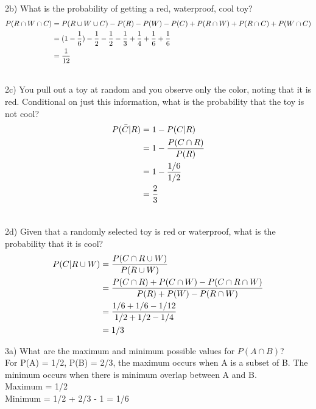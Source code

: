 \documentclass[fleqn]{article}
\begin{document}
2b) What is the probability of getting a red, waterproof, cool toy?\\
\begin{equation} \begin{aligned}
P(R \cap W \cap C) &= P(R \cup W \cup C) - P(R) - P(W) - P(C) + P(R \cap W) + P(R \cap C) + P(W \cap C)\\
		&= (1-{1\over6}) - {1\over2} -{1\over2} -{1\over3} + {1\over4} +{1\over6} + {1\over6} \\
		&={1\over12}\\ \\
\end{aligned} \end{equation}

2c) You pull out a toy at random and you observe only the color, noting that it is red. Conditional on just this information, what is the probability that the toy is not cool?\\
\begin{equation} \begin{aligned}
P(\bar C | R) &= 1-P(C|R)\\
		&= 1 - {P(C \cap R)\over P(R)}\\
		&= 1 - {1/6 \over 1/2}\\
		&={2\over3}\\ \\
\end{aligned} \end{equation}

2d) Given that a randomly selected toy is red or waterproof, what is the probability that it is cool? \\
\begin{equation} \begin{aligned}
P(C | R \cup W) &=  {P(C \cap R \cup W) \over P(R \cup W)} \\
		&=  {P(C \cap R) + P(C \cap W) - P(C\cap R\cap W) \over P(R) + P(W) - P(R \cap W)}\\
		&=  {1/6 + 1/6 -1/12 \over 1/2 + 1/2 -1/4}\\
		&= 1/3 \\
\end{aligned} \end{equation}

3a) What are the maximum and minimum possible values for $P(A \cap B)$?\\
For P(A) = 1/2, P(B) = 2/3, the maximum occurs when A is a subset of B. The minimum occurs when there is minimum overlap between A and B.\\
Maximum = 1/2 \\
Minimum = 1/2 + 2/3 - 1 = 1/6\\ \\
\end{document}
